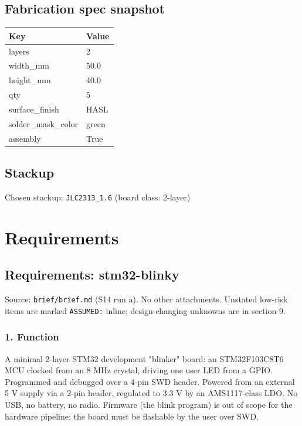 \documentclass[11pt,a4paper]{article}
\begin{document}
\subsection*{Fabrication spec snapshot}
{\small
\begin{longtable}{ll}
\toprule
\textbf{Key} & \textbf{Value} \\
\midrule
\endhead
layers & 2 \\
width\_mm & 50.0 \\
height\_mm & 40.0 \\
qty & 5 \\
surface\_finish & HASL \\
solder\_mask\_color & green \\
assembly & True \\
\bottomrule
\end{longtable}
}
\subsection*{Stackup}
Chosen stackup: \texttt{JLC2313\_1.6} (board class: 2-layer)
\section{Requirements}
\subsection*{Requirements: stm32-blinky}
Source: \texttt{brief/brief.md} (S14 run a). No other attachments. Unstated low-risk items are marked \texttt{ASSUMED:} inline; design-changing unknowns are in section 9.

\subsubsection*{1. Function}
A minimal 2-layer STM32 development "blinker" board: an STM32F103C8T6 MCU clocked from an 8 MHz crystal, driving one user LED from a GPIO. Programmed and debugged over a 4-pin SWD header. Powered from an external 5 V supply via a 2-pin header, regulated to 3.3 V by an AMS1117-class LDO. No USB, no battery, no radio. Firmware (the blink program) is out of scope for the hardware pipeline; the board must be flashable by the user over SWD.
\end{document}
